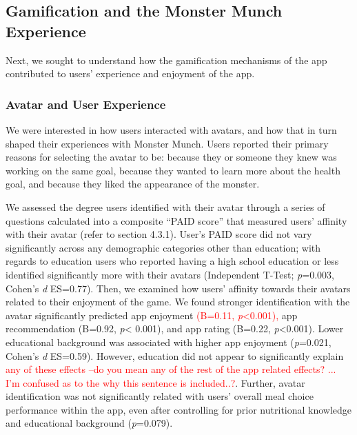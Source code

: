 \subsection{Gamification and the Monster Munch Experience}

Next, we sought to understand how the gamification mechanisms of the app contributed to users' experience and enjoyment of the app. 

\vspace{-5pt}
\subsubsection {Avatar and User Experience}
We were interested in how users interacted with avatars, and how that in turn shaped their experiences with Monster Munch. Users reported their primary reasons for selecting the avatar to be: because they or someone they knew was working on the same goal, because they wanted to learn more about the health goal, and because they liked the appearance of the monster.

We assessed the degree users identified with their avatar through a series of questions calculated into a composite ``PAID score'' that measured users' affinity with their avatar (refer to section 4.3.1). 
User's PAID score did not vary significantly across any demographic categories other than education; with regards to education users who reported having a high school education or less identified significantly more with their avatars (Independent T-Test; \textit{p}=0.003, Cohen's \textit{d} ES=0.77). 
Then, we examined  how users' affinity towards their avatars related to their enjoyment of the game. We found stronger identification with the avatar significantly predicted app enjoyment \textcolor{red}{(B=0.11, \textit{p}<0.001),} app recommendation (B=0.92, \textit{p}< 0.001), and app rating (B=0.22, \textit{p}<0.001).
Lower educational background was associated with higher app enjoyment (\textit{p}=0.021, Cohen's \textit{d} ES=0.59). However, education did not appear to significantly explain \textcolor{red}{any of these effects --do you mean any of the rest of the app related effects? ... I'm confused as to the why this sentence is included..?}. 
Further, avatar identification was not significantly related with users' overall meal choice performance within the app, even after controlling for prior nutritional knowledge and educational background (\textit{p}=0.079). 

\vspace{-5pt}
